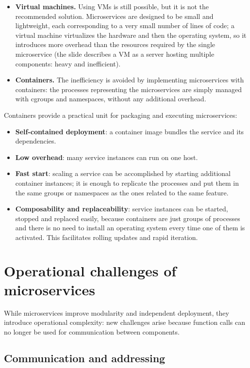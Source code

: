 \begin{itemize}
\item \textbf{Virtual machines.} Using VMs is still possible, but it is not the recommended solution. Microservices are designed to be small and lightweight, each corresponding to a very small number of lines of code; a virtual machine virtualizes the hardware and then the operating system, so it introduces more overhead than the resources required by the single microservice (the slide describes a VM as a server hosting multiple components: heavy and inefficient).
\item \textbf{Containers.} The inefficiency is avoided by implementing microservices with containers: the processes representing the microservices are simply managed with cgroups and namespaces, without any additional overhead.
\end{itemize}

Containers provide a practical unit for packaging and executing microservices:

\begin{itemize}
\item \textbf{Self-contained deployment}: a container image bundles the service and its dependencies.
\item \textbf{Low overhead}: many service instances can run on one host.
\item \textbf{Fast start}: scaling a service can be accomplished by starting additional container instances; it is enough to replicate the processes and put them in the same groups or namespaces as the ones related to the same feature.
\item \textbf{Composability and replaceability}: service instances can be started, stopped and replaced easily, because containers are just groups of processes and there is no need to install an operating system every time one of them is activated. This facilitates rolling updates and rapid iteration.
\end{itemize}

\section{Operational challenges of microservices}

While microservices improve modularity and independent deployment, they introduce operational complexity: new challenges arise because function calls can no longer be used for communication between components.

\subsection{Communication and addressing}

